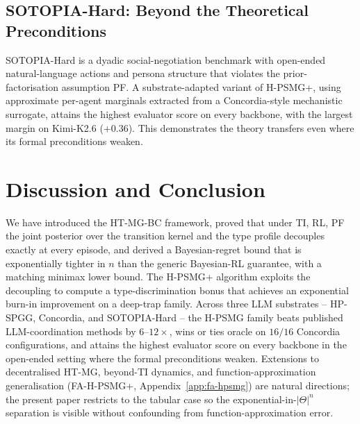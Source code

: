 ﻿\documentclass{article}
\def\textsuperscript#1{#1}%
\begin{document}
\subsection{SOTOPIA-Hard: Beyond the Theoretical Preconditions}
\label{sec:sotopia}

SOTOPIA-Hard \citep{zhou2024sotopia} is a dyadic social-negotiation benchmark with open-ended natural-language actions and persona structure that violates the prior-factorisation assumption PF. A substrate-adapted variant of H-PSMG\textsuperscript{+}, using approximate per-agent marginals extracted from a Concordia-style mechanistic surrogate, attains the highest evaluator score on every backbone, with the largest margin on Kimi-K2.6 ($+0.36$). This demonstrates the theory transfers even where its formal preconditions weaken.

\section{Discussion and Conclusion}
\label{sec:discussion}

We have introduced the HT-MG-BC framework, proved that under TI, RL, PF the joint posterior over the transition kernel and the type profile decouples exactly at every episode, and derived a Bayesian-regret bound that is exponentially tighter in $n$ than the generic Bayesian-RL guarantee, with a matching minimax lower bound. The H-PSMG\textsuperscript{+} algorithm exploits the decoupling to compute a type-discrimination bonus that achieves an exponential burn-in improvement on a deep-trap family. Across three LLM substrates -- HP-SPGG, Concordia, and SOTOPIA-Hard -- the H-PSMG family beats published LLM-coordination methods by $6$--$12\times$, wins or ties oracle on $16/16$ Concordia configurations, and attains the highest evaluator score on every backbone in the open-ended setting where the formal preconditions weaken. Extensions to decentralised HT-MG, beyond-TI dynamics, and function-approximation generalisation (FA-H-PSMG\textsuperscript{+}, Appendix~\ref{app:fa-hpsmg}) are natural directions; the present paper restricts to the tabular case so the exponential-in-$|\Theta|^n$ separation is visible without confounding from function-approximation error.




\appendix


\end{document}
